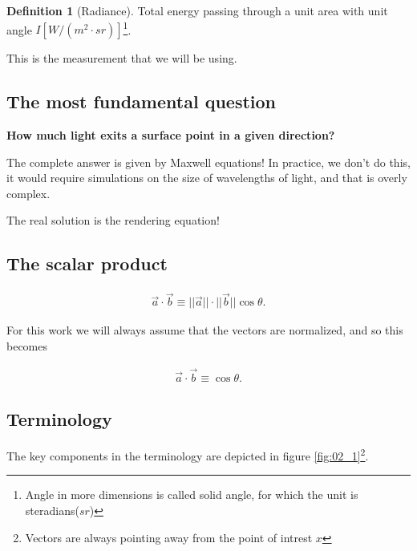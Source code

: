 \documentclass[10pt]{armath}
\numberwithin{equation}{section}
\newenvironment{Figure}
{\par\medskip\noindent\minipage{\linewidth}}
{\endminipage\par\medskip}
\theoremstyle{definition}
\newtheorem{definition}{Definition}[section]
\begin{document}
\begin{multicols}{2}
  \begin{definition}[Radiance]
    Total energy passing through a unit area with unit angle
    $I\left[W/\left(m^2\cdot sr\right)\right]$\footnote{Angle in more dimensions
      is called solid angle, for which the unit is steradians($sr$)}.
  \end{definition}

  This is the measurement that we will be using.

  \subsection{The most fundamental question}%
  \label{sub:the_most_fundamental_question}

  \textbf{How much light exits a surface point in a given direction?}

  The complete answer is given by Maxwell equations! In practice, we don't do
  this, it would require simulations on the size of wavelengths of light, and
  that is overly complex.

  The real solution is the rendering equation!

  \subsection{The scalar product}%
  \label{sub:the_scalar_product}

  \begin{align*}
    \vec{a}\cdot\vec{b}\equiv||\vec{a}||\cdot||\vec{b}||\cos\theta.
  \end{align*}

  For this work we will always assume that the vectors are normalized, and so
  this becomes

  \begin{align*}
    \vec{a}\cdot\vec{b}\equiv\cos\theta.
  \end{align*}

  \subsection{Terminology}%
  \label{sub:terminology}

  The key components in the terminology are depicted in figure
  \ref{fig:02_1}\footnote{Vectors are always pointing away from the point of
    intrest $x$}.

  \begin{Figure}
    \begin{center}
      
    \end{center}
    \label{fig:02_1}
  \end{Figure}


\end{multicols}
\end{document}
